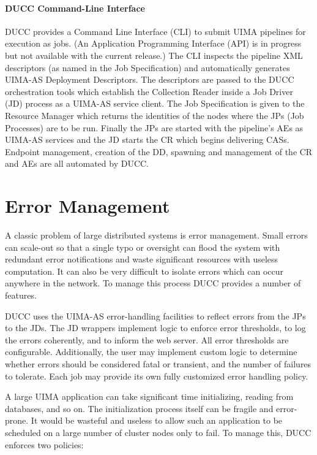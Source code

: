     \paragraph{DUCC Command-Line Interface}
    DUCC provides a Command Line Interface (CLI) to submit UIMA pipelines for execution as jobs. 
    (An Application Programming Interface (API) is in progress but not available with the current 
    release.) The CLI inspects the pipeline XML descriptors (as named in the Job Specification) 
    and automatically generates UIMA-AS Deployment Descriptors. The descriptors are passed to 
    the DUCC orchestration tools which establish the Collection Reader inside a Job Driver (JD) 
    process as a UIMA-AS service client. The Job Specification is given to the Resource Manager 
    which returns the identities of the nodes where the JPs (Job Processes) are to be run. Finally the 
    JPs are started with the pipeline's AEs as UIMA-AS services and the JD starts the CR which begins 
    delivering CASs. Endpoint management, creation of the DD, spawning and management of the CR 
    and AEs are all automated by DUCC. 

    \section{Error Management }
    A classic problem of large distributed systems is error management. Small errors can scale-out
    so that a single typo or oversight can flood the system with redundant error notifications and
    waste significant resources with useless computation. It can also be very difficult to isolate
    errors which can occur anywhere in the network. To manage this process DUCC provides a number of
    features.

    DUCC uses the UIMA-AS error-handling facilities to reflect errors from the JPs to the JDs. The
    JD wrappers implement logic to enforce error thresholds, to log the errors coherently, and to
    inform the web server. All error thresholds are configurable. Additionally, the user may
    implement custom logic to determine whether errors should be considered fatal or transient, and
    the number of failures to tolerate. Each job may provide its own fully customized error handling
    policy.

    A large UIMA application can take significant time initializing, reading from databases, and so
    on. The initialization process itself can be fragile and error-prone. It would be wasteful and
    useless to allow such an application to be scheduled on a large number of cluster nodes only to
    fail. To manage this, DUCC enforces two policies:
    
